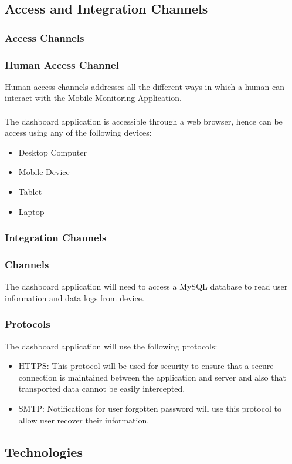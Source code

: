 \documentclass[hidelinks, 12pt, oneside]{article}
\begin{document}
	\subsection{Access and Integration Channels}
	\subsubsection{Access Channels}
	\subsubsection*{Human Access Channel}
	Human access channels addresses all the different ways in which a human can interact with the Mobile Monitoring Application.\\\\ The dashboard application is accessible through a web browser, hence can be access using any of the following devices: 
	\begin{itemize}
		\item Desktop Computer
		\item Mobile Device
		\item Tablet
		\item Laptop  
	\end{itemize}
	\subsubsection{Integration Channels}
	\subsubsection*{Channels}
	The dashboard application will need to access a MySQL database to read user information and data logs from device.    	\subsubsection*{Protocols}
	The dashboard application will use the following protocols:
	\begin{itemize}
	\item HTTPS: This protocol will be used for security to ensure that a secure connection is maintained between the application and server and also that transported data cannot be easily intercepted.
	\item SMTP: Notifications for user forgotten password will use this protocol to allow user recover their information.  
	\end{itemize}	 
	\newpage
	\subsection{Technologies}
\end{document}
